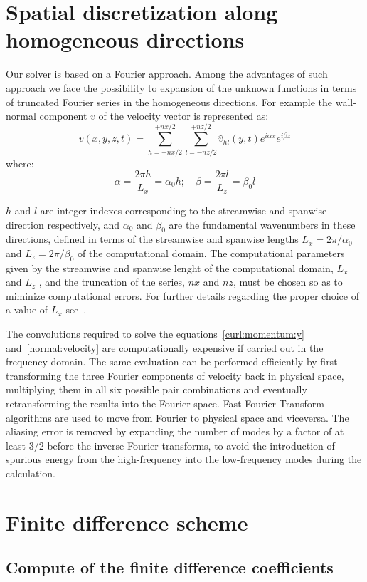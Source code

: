 \section{Spatial discretization along homogeneous directions}
Our solver is based on a Fourier approach. Among the advantages of such approach we face the possibility to expansion of the unknown functions in terms of truncated Fourier series in the homogeneous directions. For example the wall-normal component $v$ of the velocity vector is represented as:
\begin{equation}
v(x,y,z,t) = \sum_{h=-nx/2}^{+nx/2} \sum_{l=-nz/2}^{+nz/2} \hat{v}_{hl}(y,t) e^{i\alpha x}e^{i \beta z}
\end{equation}
where:
\begin{equation}
\alpha = \frac{2\pi h}{L_{x}} = \alpha_{0} h; \quad \beta= \frac{2 \pi l}{L_{z}} = \beta_{0}l
\end{equation}

$h$ and $l$ are integer indexes corresponding to the streamwise and spanwise direction respectively, and $\alpha_{0}$ and $\beta_{0}$ are the fundamental wavenumbers in these directions, defined in terms of the streamwise and spanwise lengths $L_{x} = {2\pi}/{\alpha_{0}} $ and $L_{z} = {2 \pi}/{\beta_{0}}$ of the computational domain. The computational parameters given by the streamwise and spanwise lenght of the computational domain, $L_{x}$ and $L_{z}$ , and the truncation of the series, $nx$ and $nz$, must be chosen so as to miminize computational errors. For further details regarding the proper choice of a value of $L_{x}$ see~\cite{QuadrioMaurizio2003Issi}.

The convolutions required to solve the equations~\ref{curl:momentum:y} and~\ref{normal:velocity} are computationally expensive if carried out in the frequency domain. The same evaluation can be performed efficiently by first transforming the three Fourier components of velocity back in physical space, multiplying them in all six possible pair combinations and eventually retransforming the results into the Fourier space. Fast Fourier Transform algorithms are used to move from Fourier to physical space and viceversa. The aliasing error is removed by expanding the number of modes by a factor of at least $3/2$ before the inverse Fourier transforms, to avoid the introduction of spurious energy from the high-frequency into the low-frequency modes during the calculation.



\section{Finite difference scheme}


\subsection{Compute of the finite difference coefficients}